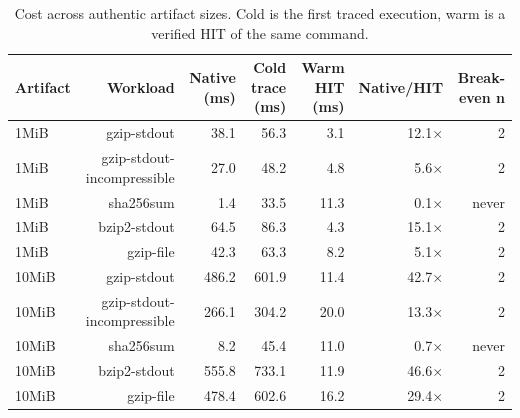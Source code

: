 \begin{table}[t]
\centering
\small
\caption{Cost across authentic artifact sizes. Cold is the first traced execution, warm is a verified HIT of the same command.}
\label{tab:artifact_scale}
\begin{tabular}{lrrrrrr}
\toprule
\textbf{Artifact} & \textbf{Workload} & \textbf{Native (ms)} & \textbf{Cold trace (ms)} & \textbf{Warm HIT (ms)} & \textbf{Native/HIT} & \textbf{Break-even n} \\
\midrule
1MiB & gzip-stdout & 38.1 & 56.3 & 3.1 & 12.1× & 2 \\
1MiB & gzip-stdout-incompressible & 27.0 & 48.2 & 4.8 & 5.6× & 2 \\
1MiB & sha256sum & 1.4 & 33.5 & 11.3 & 0.1× & never \\
1MiB & bzip2-stdout & 64.5 & 86.3 & 4.3 & 15.1× & 2 \\
1MiB & gzip-file & 42.3 & 63.3 & 8.2 & 5.1× & 2 \\
10MiB & gzip-stdout & 486.2 & 601.9 & 11.4 & 42.7× & 2 \\
10MiB & gzip-stdout-incompressible & 266.1 & 304.2 & 20.0 & 13.3× & 2 \\
10MiB & sha256sum & 8.2 & 45.4 & 11.0 & 0.7× & never \\
10MiB & bzip2-stdout & 555.8 & 733.1 & 11.9 & 46.6× & 2 \\
10MiB & gzip-file & 478.4 & 602.6 & 16.2 & 29.4× & 2 \\
\bottomrule
\end{tabular}
\end{table}
